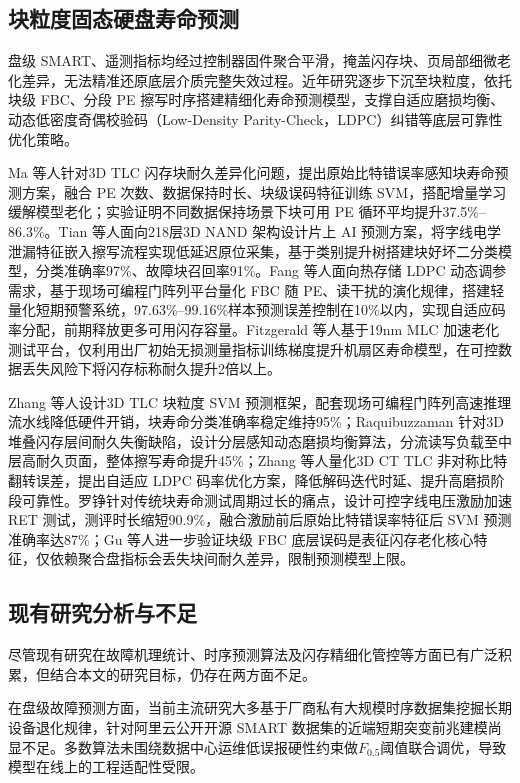 \subsection{块粒度固态硬盘寿命预测}
盘级 SMART、遥测指标均经过控制器固件聚合平滑，掩盖闪存块、页局部细微老化差异，无法精准还原底层介质完整失效过程。近年研究逐步下沉至块粒度，依托块级 FBC、分段 PE 擦写时序搭建精细化寿命预测模型，支撑自适应磨损均衡、动态低密度奇偶校验码（Low-Density Parity-Check，LDPC）纠错等底层可靠性优化策略。

Ma 等人针对3D TLC 闪存块耐久差异化问题，提出原始比特错误率感知块寿命预测方案，融合 PE 次数、数据保持时长、块级误码特征训练 SVM，搭配增量学习缓解模型老化；实验证明不同数据保持场景下块可用 PE 循环平均提升37.5\%–86.3\%\cite{ma2019rber}。Tian 等人面向218层3D NAND 架构设计片上 AI 预测方案，将字线电学泄漏特征嵌入擦写流程实现低延迟原位采集，基于类别提升树搭建块好坏二分类模型，分类准确率97\%、故障块召回率91\%\cite{tian2024intelligent}。Fang 等人面向热存储 LDPC 动态调参需求，基于现场可编程门阵列平台量化 FBC 随 PE、读干扰的演化规律，搭建轻量化短期预警系统，97.63\%–99.16\%样本预测误差控制在10\%以内，实现自适应码率分配，前期释放更多可用闪存容量\cite{fang2022work,fang2023high}。Fitzgerald 等人基于19nm MLC 加速老化测试平台，仅利用出厂初始无损测量指标训练梯度提升机扇区寿命模型，在可控数据丢失风险下将闪存标称耐久提升2倍以上\cite{fitzgerald2021early}。

Zhang 等人设计3D TLC 块粒度 SVM 预测框架，配套现场可编程门阵列高速推理流水线降低硬件开销，块寿命分类准确率稳定维持95\%\cite{zhang2021svm}；Raquibuzzaman 针对3D 堆叠闪存层间耐久失衡缺陷，设计分层感知动态磨损均衡算法，分流读写负载至中层高耐久页面，整体擦写寿命提升45\%\cite{raquibuzzaman2022intrablock}；Zhang 等人量化3D CT TLC 非对称比特翻转误差，提出自适应 LDPC 码率优化方案，降低解码迭代时延、提升高磨损阶段可靠性\cite{zhang2020beldpc}。罗铮针对传统块寿命测试周期过长的痛点，设计可控字线电压激励加速 RET 测试，测评时长缩短90.9\%，融合激励前后原始比特错误率特征后 SVM 预测准确率达87\%\cite{GDGX202406007}；Gu 等人进一步验证块级 FBC 底层误码是表征闪存老化核心特征，仅依赖聚合盘指标会丢失块间耐久差异，限制预测模型上限\cite{gu2024exploit}。


\clearpage
\subsection{现有研究分析与不足}
尽管现有研究在故障机理统计、时序预测算法及闪存精细化管控等方面已有广泛积累，但结合本文的研究目标，仍存在两方面不足。

在盘级故障预测方面，当前主流研究大多基于厂商私有大规模时序数据集挖掘长期设备退化规律，针对阿里云公开开源 SMART 数据集的近端短期突变前兆建模尚显不足。多数算法未围绕数据中心运维低误报硬性约束做$F_{0.5}$阈值联合调优，导致模型在线上的工程适配性受限\cite{zhang2024msfrd,zhang2023multi,koh2024temporal, zhou2023proactive}。

